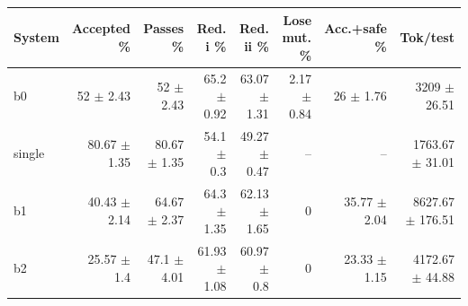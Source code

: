 \begin{tabular}{lrrrrrrr}
\toprule
System & Accepted \% & Passes \% & Red. i \% & Red. ii \% & Lose mut. \% & Acc.+safe \% & Tok/test \\
\midrule
b0 & 52 $\pm$ 2.43 & 52 $\pm$ 2.43 & 65.2 $\pm$ 0.92 & 63.07 $\pm$ 1.31 & 2.17 $\pm$ 0.84 & 26 $\pm$ 1.76 & 3209 $\pm$ 26.51 \\
single & 80.67 $\pm$ 1.35 & 80.67 $\pm$ 1.35 & 54.1 $\pm$ 0.3 & 49.27 $\pm$ 0.47 & -- & -- & 1763.67 $\pm$ 31.01 \\
b1 & 40.43 $\pm$ 2.14 & 64.67 $\pm$ 2.37 & 64.3 $\pm$ 1.35 & 62.13 $\pm$ 1.65 & 0 & 35.77 $\pm$ 2.04 & 8627.67 $\pm$ 176.51 \\
b2 & 25.57 $\pm$ 1.4 & 47.1 $\pm$ 4.01 & 61.93 $\pm$ 1.08 & 60.97 $\pm$ 0.8 & 0 & 23.33 $\pm$ 1.15 & 4172.67 $\pm$ 44.88 \\
\bottomrule
\end{tabular}
